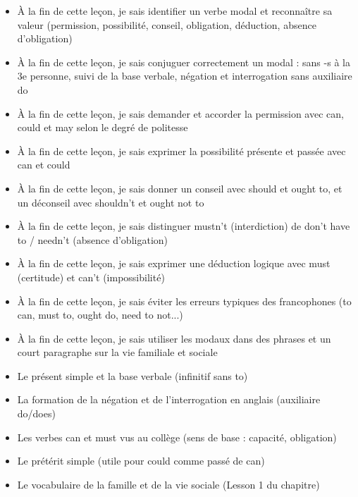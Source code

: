 \documentclass[11pt]{article}
\begin{document}
\begin{objectifs}
\begin{itemize}
\item À la fin de cette leçon, je sais identifier un verbe modal et reconnaître sa valeur (permission, possibilité, conseil, obligation, déduction, absence d'obligation)
\item À la fin de cette leçon, je sais conjuguer correctement un modal : sans -s à la 3e personne, suivi de la base verbale, négation et interrogation sans auxiliaire do
\item À la fin de cette leçon, je sais demander et accorder la permission avec can, could et may selon le degré de politesse
\item À la fin de cette leçon, je sais exprimer la possibilité présente et passée avec can et could
\item À la fin de cette leçon, je sais donner un conseil avec should et ought to, et un déconseil avec shouldn't et ought not to
\item À la fin de cette leçon, je sais distinguer mustn't (interdiction) de don't have to / needn't (absence d'obligation)
\item À la fin de cette leçon, je sais exprimer une déduction logique avec must (certitude) et can't (impossibilité)
\item À la fin de cette leçon, je sais éviter les erreurs typiques des francophones (to can, must to, ought do, need to not...)
\item À la fin de cette leçon, je sais utiliser les modaux dans des phrases et un court paragraphe sur la vie familiale et sociale
\end{itemize}
\end{objectifs}

\begin{prerequis}
\begin{itemize}
\item Le présent simple et la base verbale (infinitif sans to)
\item La formation de la négation et de l'interrogation en anglais (auxiliaire do/does)
\item Les verbes can et must vus au collège (sens de base : capacité, obligation)
\item Le prétérit simple (utile pour could comme passé de can)
\item Le vocabulaire de la famille et de la vie sociale (Lesson 1 du chapitre)
\end{itemize}
\end{prerequis}
\end{document}
